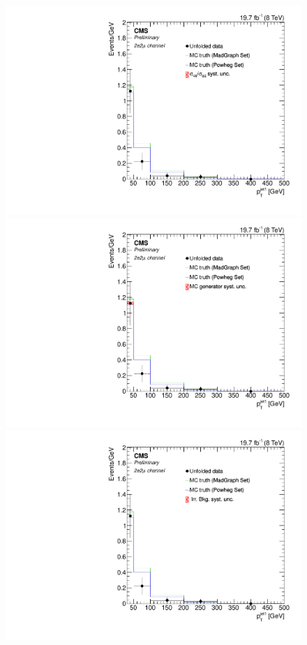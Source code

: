 \begin{figure}[hbtp]
 \begin{center}
   \includegraphics[width=0.8\cmsFigWidth]{Figures/Unfolding/Systematics/ZZTo2e2m_PtJet1_qqgg_Mad_fr}     
   \includegraphics[width=0.8\cmsFigWidth]{Figures/Unfolding/Systematics/ZZTo2e2m_PtJet1_MCgen_Mad_fr}     
   \includegraphics[width=0.8\cmsFigWidth]{Figures/Unfolding/Systematics/ZZTo2e2m_PtJet1_IrrBkg_Mad_fr}

\end{center}
\end{figure}

